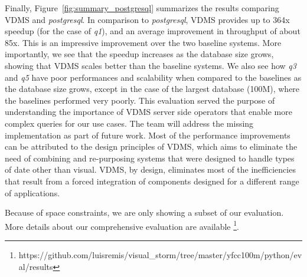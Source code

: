 Finally, Figure~\ref{fig:summary_postgresql} summarizes the results
comparing VDMS and \textit{postgresql}.
In comparison to \textit{postgresql}, VDMS provides up to 364x speedup
(for the case of \textit{q1}),
and an average improvement in throughput of about 85x.
This is an impressive improvement over the two baseline systems.
More importantly, we see that the speedup increases as the database size grows,
showing that VDMS scales better than the baseline systems.
We also see how \textit{q3} and \textit{q5} have poor performances and scalability
when compared to the baselines as the database size grows, except in the
case of the largest database (100M), where the baselines performed very poorly.
This evaluation served the
purpose of understanding the importance of VDMS server side operators
that enable more complex queries for our use cases.
The team will address the missing implementation as part of future work.
Most of the performance improvements can be attributed to the design
principles of VDMS, which aims to eliminate the need of combining and
re-purposing systems that were designed to handle types of date other than visual.
VDMS, by design, eliminates most of the inefficiencies that result
from a forced integration of components designed for a
different range of applications.

Because of space constraints, we are only showing a subset of our evaluation.
More details about our comprehensive evaluation are available
\footnote{https://github.com/luisremis/visual\_storm/tree/master/yfcc100m/python/eval/results}.

